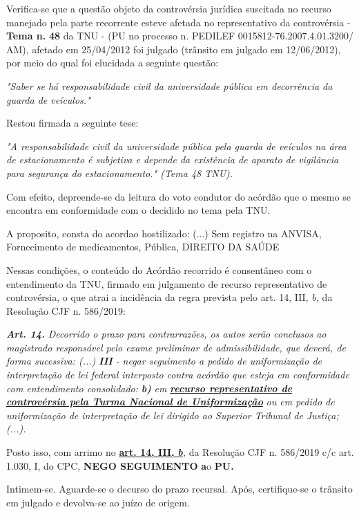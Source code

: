 \documentclass[12pt]{article}
\begin{document}
\justifying
\noindent Verifica-se que a questão objeto da controvérsia jurídica suscitada no recurso manejado pela parte recorrente esteve afetada no representativo da controvérsia - \textbf{Tema n. }\textbf{48} da TNU - (PU no processo n. PEDILEF 0015812-76.2007.4.01.3200/ AM),  afetado em 25/04/2012 foi julgado (trânsito em julgado em 12/06/2012), por meio do qual foi elucidada a seguinte questão:

\noindent \textit{"Saber se há responsabilidade civil da universidade pública em decorrência da guarda de veículos."}

\noindent Restou firmada a seguinte tese:

\noindent \textit{"A responsabilidade civil da universidade pública pela guarda de veículos na área de estacionamento é subjetiva e depende da existência de aparato de vigilância para segurança do estacionamento." (Tema 48 TNU).}

\noindent Com efeito, depreende-se da leitura do voto condutor do acórdão que o mesmo se encontra em conformidade com o decidido no  tema pela TNU.

\noindent A proposito, consta do acordao hostilizado: (...) Sem registro na ANVISA, Fornecimento de medicamentos, Pública, DIREITO DA SAÚDE

\noindent Nessas condições, o conteúdo do Acórdão recorrido é consentâneo com o entendimento da TNU, firmado em julgamento de recurso representativo de controvérsia, o que atrai a incidência da regra prevista pelo art. 14, III, \textit{b,} da Resolução CJF n. 586/2019:

\noindent \textit{\textbf{Art. 14.}}\textit{ Decorrido o prazo para contrarrazões, os autos serão conclusos ao magistrado responsável pelo exame preliminar de admissibilidade, que deverá, de forma sucessiva: (...) }\textit{\textbf{III }}\textit{- negar seguimento a pedido de uniformização de interpretação de lei federal interposto contra acórdão que esteja em conformidade com entendimento consolidado: }\textit{\textbf{b)}}\textit{ em }\uline{\textit{\textbf{recurso representativo de controvérsia pela Turma Nacional de Uniformização}}}\textit{ ou em pedido de uniformização de interpretação de lei dirigido ao Superior Tribunal de Justiça;(...).}

\noindent Posto isso, com arrimo no \uline{\textbf{art. 14, III, }}\uline{\textit{\textbf{b}}}\textit{,} da Resolução CJF n. 586/2019 c/c art. 1.030, I, do CPC, \textbf{NEGO SEGUIMENTO }\textbf{a}o\textbf{ PU}\textbf{.}

\noindent Intimem-se. Aguarde-se o decurso do prazo recursal. Após, certifique-se o trânsito em julgado e devolva-se ao juízo de origem.
\end{document}
